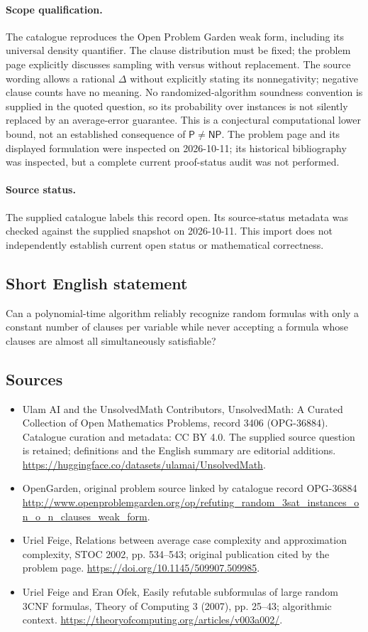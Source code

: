\documentclass[11pt]{article}
\begin{document}
\paragraph{Scope qualification.}
The catalogue reproduces the Open Problem Garden weak form, including its universal density quantifier. The clause distribution must be fixed; the problem page explicitly discusses sampling with versus without replacement. The source wording allows a rational $\Delta$ without explicitly stating its nonnegativity; negative clause counts have no meaning. No randomized-algorithm soundness convention is supplied in the quoted question, so its probability over instances is not silently replaced by an average-error guarantee. This is a conjectural computational lower bound, not an established consequence of $\mathsf{P}\ne\mathsf{NP}$. The problem page and its displayed formulation were inspected on 2026-10-11; its historical bibliography was inspected, but a complete current proof-status audit was not performed.
\paragraph{Source status.}
The supplied catalogue labels this record open. Its source-status metadata was checked against the supplied snapshot on 2026-10-11. This import does not independently establish current open status or mathematical correctness.
\subsection{Short English statement}
Can a polynomial-time algorithm reliably recognize random formulas with only a constant number of clauses per variable while never accepting a formula whose clauses are almost all simultaneously satisfiable?
\subsection{Sources}
\begin{itemize}
\item[\hypertarget{source:3406:1}{S1}] Ulam AI and the UnsolvedMath Contributors, UnsolvedMath: A Curated Collection of Open Mathematics Problems, record 3406 (OPG-36884). Catalogue curation and metadata: CC BY 4.0. The supplied source question is retained; definitions and the English summary are editorial additions.
\url{https://huggingface.co/datasets/ulamai/UnsolvedMath}.
\item[\hypertarget{source:3406:2}{S2}] OpenGarden, original problem source linked by catalogue record OPG-36884
\url{http://www.openproblemgarden.org/op/refuting_random_3sat_instances_on_o_n_clauses_weak_form}.
\item[\hypertarget{source:3406:3}{S3}] Uriel Feige, Relations between average case complexity and approximation complexity, STOC 2002, pp. 534--543; original publication cited by the problem page.
\url{https://doi.org/10.1145/509907.509985}.
\item[\hypertarget{source:3406:4}{S4}] Uriel Feige and Eran Ofek, Easily refutable subformulas of large random 3CNF formulas, Theory of Computing 3 (2007), pp. 25--43; algorithmic context.
\url{https://theoryofcomputing.org/articles/v003a002/}.
\end{itemize}
\end{document}
